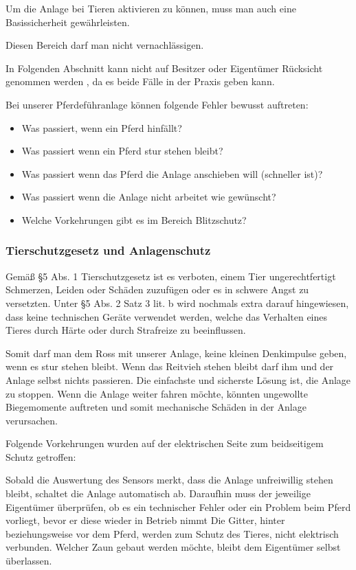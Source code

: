 \documentclass[12pt]{scrartcl}
\begin{document}
Um die Anlage bei Tieren aktivieren zu können, muss man auch eine Basissicherheit gewährleisten.

Diesen Bereich darf man nicht vernachlässigen. 

In Folgenden Abschnitt  kann nicht auf Besitzer oder Eigentümer Rücksicht genommen werden , da es beide Fälle in der Praxis geben kann.

Bei unserer Pferdeführanlage können folgende Fehler bewusst auftreten:

\begin{itemize}
\item{Was passiert, wenn ein Pferd hinfällt?}
\item{Was passiert wenn ein Pferd stur stehen bleibt?}
\item{Was passiert wenn das Pferd die Anlage anschieben will (schneller ist)?}
\item{Was passiert wenn die Anlage nicht arbeitet wie gewünscht?}
\item{Welche Vorkehrungen gibt es im Bereich Blitzschutz?}
\end{itemize}

\subsubsection{Tierschutzgesetz und Anlagenschutz}
\label{sec:tierschutzgesetzUndAnlagenschutz}

Gemäß §5 Abs. 1 Tierschutzgesetz ist es verboten, 
einem Tier ungerechtfertigt Schmerzen, Leiden oder Schäden zuzufügen oder es in schwere Angst zu versetzten. 
Unter §5 Abs. 2 Satz 3 lit. b wird nochmals extra darauf hingewiesen, dass keine technischen Geräte verwendet werden, welche das Verhalten eines Tieres durch Härte oder durch Strafreize zu beeinflussen. 

Somit darf man dem Ross mit unserer Anlage, keine kleinen Denkimpulse geben, wenn es stur stehen bleibt. Wenn das Reitvieh stehen bleibt darf ihm und der Anlage selbst nichts passieren. Die einfachste und sicherste Lösung ist, die Anlage zu stoppen. Wenn die Anlage weiter fahren möchte, könnten ungewollte Biegemomente auftreten und somit mechanische Schäden in der Anlage verursachen.

Folgende Vorkehrungen wurden auf der elektrischen Seite zum beidseitigem Schutz getroffen:

Sobald die Auswertung des Sensors merkt, dass die Anlage unfreiwillig stehen bleibt, schaltet die Anlage automatisch ab. Daraufhin muss der jeweilige Eigentümer überprüfen, ob es ein technischer Fehler oder ein Problem beim Pferd vorliegt, bevor er diese wieder in Betrieb nimmt
Die Gitter, hinter beziehungsweise vor dem Pferd, werden zum Schutz des Tieres, nicht elektrisch verbunden.
Welcher Zaun gebaut werden möchte, bleibt dem Eigentümer selbst überlassen.
\end{document}
